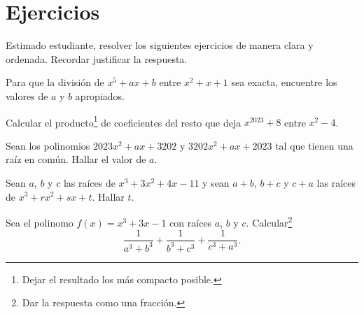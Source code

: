 \section*{\large Ejercicios}

Estimado estudiante, resolver los siguientes ejercicios de manera clara y ordenada. Recordar justificar la respuesta.

\begin{exercise}
    Para que la división de $x^5 + ax + b$ entre $x^2 + x + 1$ sea exacta, encuentre los valores de $a$ y $b$ apropiados.
\end{exercise}

\begin{exercise}
    Calcular el producto\footnote{Dejar el resultado los más compacto posible.} de coeficientes del resto que deja $x^{2023} + 8$ entre $x^2 - 4$.
\end{exercise}

\begin{exercise}
    Sean los polinomios $2023x^2 + ax + 3202$ y $3202x^2 + ax + 2023$ tal que tienen una raíz en común.
    Hallar el valor de $a$.
\end{exercise}

\begin{exercise}
    Sean $a$, $b$ y $c$ las raíces de $x^3 + 3x^2 + 4x - 11$ y sean $a + b$, $b + c$ y $c + a$ las raíces de $x^3 + rx^2 + sx + t$.
    Hallar $t$.
\end{exercise}

\begin{exercise}
    Sea el polinomo $f(x) = x^3 + 3x - 1$ con raíces $a$, $b$ y $c$.
    Calcular\footnote{Dar la respuesta como una fracción.}
    \[\frac{1}{a^3 + b^3} + \frac{1}{b^3 + c^3} + \frac{1}{c^3 + a^3}.\]
\end{exercise}

